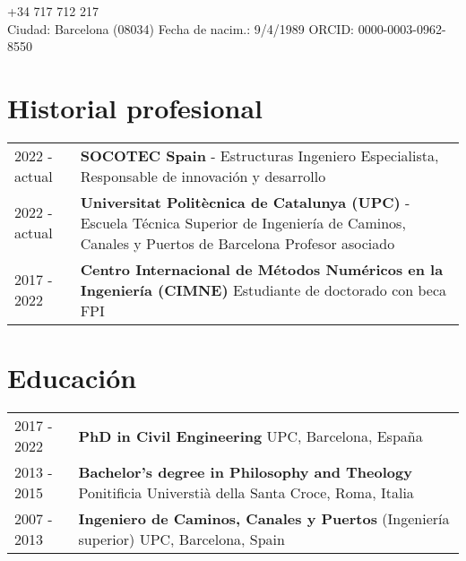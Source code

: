 \documentclass[11pt]{article}
\author{Dr. Ing. Miguel Masó}
\begin{document}
\maketitle
{} \qquad +34 717 712 217 \\
Ciudad: Barcelona (08034) \qquad
Fecha de nacim.: 9/4/1989 \qquad
ORCID: 0000-0003-0962-8550


\section{Historial profesional}
\begin{tabularx}{\linewidth}{lX}
    2022 - actual &
    \textbf{SOCOTEC Spain} - Estructuras \newline
    Ingeniero Especialista, Responsable de innovación y desarrollo \\

    2022 - actual &
    \textbf{Universitat Politècnica de Catalunya (UPC)} - Escuela Técnica Superior de Ingeniería de Caminos, Canales y Puertos de Barcelona \newline
    Profesor asociado \\ 

    2017 - 2022 &
    \textbf{Centro Internacional de Métodos Numéricos en la Ingeniería (CIMNE)} \newline
    Estudiante de doctorado con beca FPI \\
\end{tabularx}


\section{Educación}
\begin{tabularx}{\linewidth}{lX}
    2017 - 2022 &
    \textbf{PhD in Civil Engineering} \newline
    UPC, Barcelona, España \\

    2013 - 2015 &
    \textbf{Bachelor's degree in Philosophy and Theology} \newline
    Ponitificia Universtià della Santa Croce, Roma, Italia \\

    2007 - 2013 &
    \textbf{Ingeniero de Caminos, Canales y Puertos} (Ingeniería superior) \newline
    UPC, Barcelona, Spain \\
\end{tabularx}
\end{document}
